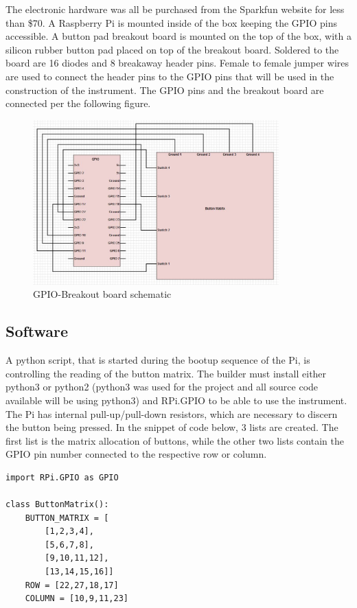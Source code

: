 \documentclass{nime-alternate}
\begin{document}
The electronic hardware was all be purchased from the Sparkfun website for less than \$70. A Raspberry Pi\cite{RPi} is mounted inside of the box keeping the GPIO pins accessible. A button pad breakout board\cite{PCB} is mounted on the top of the box, with a silicon rubber button pad\cite{BP} placed on top of the breakout board. Soldered to the board are 16 diodes\cite{DIO} and 8 breakaway header pins\cite{BH}. Female to female jumper wires\cite{Jumper} are used to connect the header pins to the GPIO pins that will be used in the construction of the instrument. The GPIO pins and the breakout board are connected per the following figure.

\begin{figure}[h!]
\caption{GPIO-Breakout board schematic}
\label{schematic}
\centering
\includegraphics[height=2.5in]{ffschematic.jpg}
\end{figure}

\subsection{Software}
A python script, that is started during the bootup sequence of the Pi, is controlling the reading of the button matrix. The builder must install either python3 or python2 (python3 was used for the project and all source code available will be using python3) and RPi.GPIO\cite{RPi.GPIO} to be able to use the instrument. The Pi has internal pull-up/pull-down resistors, which are necessary to discern the button being pressed. In the snippet of code below, 3 lists are created. The first list is the matrix allocation of buttons, while the other two lists contain the GPIO pin number connected to the respective row or column. 
 
\begin{verbatim}
import RPi.GPIO as GPIO

class ButtonMatrix():
	BUTTON_MATRIX = [
		[1,2,3,4],
		[5,6,7,8],
		[9,10,11,12],
		[13,14,15,16]]
	ROW = [22,27,18,17]
	COLUMN = [10,9,11,23]
\end{verbatim}
\end{document}
